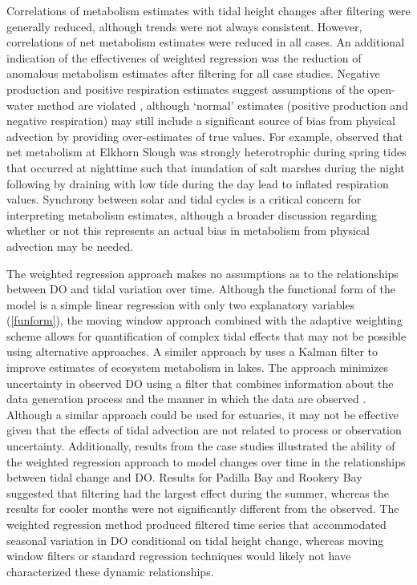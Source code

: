 \documentclass[letterpaper,12pt,oneside]{article}\usepackage[]{graphicx}\usepackage[]{color}
\begin{document}
Correlations of metabolism estimates with tidal height changes after filtering were generally reduced, although trends were not always consistent.  However, correlations of net metabolism estimates were reduced in all cases.  An additional indication of the effectivenes of weighted regression was the reduction of anomalous metabolism estimates after filtering for all case studies.  Negative production and positive respiration estimates suggest assumptions of the open-water method are violated \citep{Needoba12}, although `normal' estimates (positive production and negative respiration) may still include a significant source of bias from physical advection by providing over-estimates of true values.  For example, \citet{Nidzieko14} observed that net metabolism at Elkhorn Slough was strongly heterotrophic during spring tides that occurred at nighttime such that inundation of salt marshes during the night following by draining with low tide during the day lead to inflated respiration values.   Synchrony between solar and tidal cycles is a critical concern for interpreting metabolism estimates, although a broader discussion regarding whether or not this represents an actual bias in metabolism from physical advection may be needed. 

The weighted regression approach makes no assumptions as to the relationships between \ac{DO} and tidal variation over time.  Although the functional form of the model is a simple linear regression with only two explanatory variables (\cref{funform}), the moving window approach combined with the adaptive weighting scheme allows for quantification of complex tidal effects that may not be possible using alternative approaches.  A similer approach by \citet{Batt12} uses a Kalman filter to improve estimates of ecosystem metabolism in lakes.  The approach minimizes uncertainty in observed \ac{DO} using a filter that combines information about the data generation process and the manner in which the data are observed \citep{Harvey89}.  Although a similar approach could be used for estuaries, it may not be effective given that the effects of tidal advection are not related to process or observation uncertainty.  Additionally, results from the case studies illustrated the ability of the weighted regression approach to model changes over time in the relationships between tidal change and \ac{DO}.  Results for Padilla Bay and Rookery Bay suggested that filtering had the largest effect during the summer, whereas the results for cooler months were not significantly different from the observed.  The weighted regression method produced filtered time series that accommodated seasonal variation in \ac{DO} conditional on tidal height change, whereas moving window filters or standard regression techniques would likely not have characterized these dynamic relationships.
\end{document}
